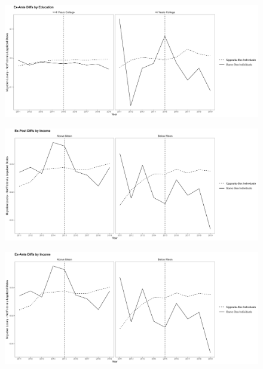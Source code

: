 \documentclass[12pt,letterpaper]{article}
\begin{document}
\begin{figure}[h]
    \centering
    \includegraphics[width=0.75\linewidth]{outputs/summary_stats/educ_ante_diffs.png}
    \caption{}
    \label{fig: fig:enter-label}
\end{figure}

\begin{figure}[h]
    \centering
    \includegraphics[width=0.75\linewidth]{outputs/summary_stats/inc_post_diffs.png}
    \caption{}
    \label{fig: fig:enter-label}
\end{figure}

\begin{figure}[h]
    \centering
    \includegraphics[width=0.75\linewidth]{outputs/summary_stats/inc_ante_diffs.png}
    \caption{}
    \label{fig: fig:enter-label}
\end{figure}

\FloatBarrier
\newpage
\end{document}
